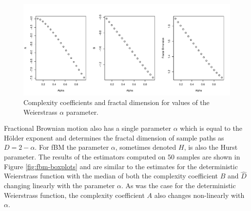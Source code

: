 \begin{figure}[!htbp]
  \begin{center}
  \includegraphics[width = \textwidth, keepaspectratio]{./figs/holder_notrandom-param-plots-notrandom.pdf}
  \end{center} 
  \caption{Complexity coefficients and fractal dimension 
    for values of the Weierstrass $\alpha$ parameter.  }
  \label{fig:notrandom-params}
\end{figure}


Fractional Brownian motion also has 
a single parameter $\alpha$ which is equal to
 the H\"older exponent and determines the fractal dimension of
sample paths as $D = 2 - \alpha$. For fBM the 
parameter $\alpha$, sometimes denoted $H$, is also 
the Hurst parameter. The results 
of the estimators computed on 50 samples are shown 
in Figure \ref{fig:fbm-boxplots} and are similar 
to the estimates for the deterministic Weierstrass 
function with the median of both the complexity
coefficient $B$ and $\hat D$ changing linearly
with the parameter $\alpha$. As was
the case for the deterministic Weierstrass 
function, the complexity 
coefficient $A$ also changes non-linearly with 
$\alpha$.





